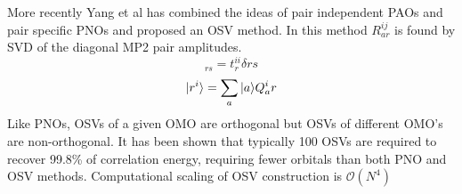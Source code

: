 		More recently Yang et al\cite{yang2011} has combined the ideas of pair independent PAOs and pair specific PNOs and proposed an OSV method. In this method $R^{ij}_{ar}$ is found by SVD of the diagonal MP2 pair amplitudes.  
			\begin{equation}
				[R^{i\dagger} T^{ij} R^{i}]_{rs} = t^{ii}_r \delta{rs}
			\end{equation}
			\begin{equation}
				| r^i \rangle = \sum_a | a \rangle Q^i_ar
			\end{equation}
		Like PNOs, OSVs of a given OMO are orthogonal but OSVs of different OMO's are non-orthogonal.  It has been shown that typically 100 OSVs are required to recover 99.8\% of correlation energy, requiring fewer orbitals than both PNO and OSV methods. Computational scaling of OSV construction is $\mathcal{O}(N^4)$